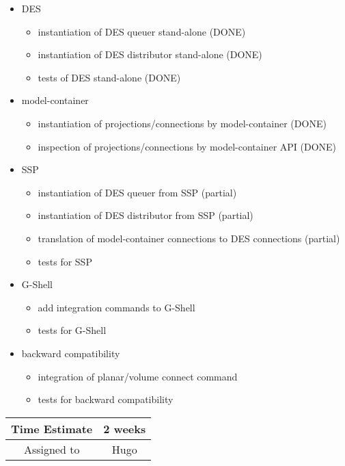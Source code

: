 \documentclass[12pt]{article}
\begin{document}
\begin{itemize}
\item DES
  \begin{itemize}
  \item instantiation of DES queuer stand-alone (DONE)
  \item instantiation of DES distributor stand-alone (DONE)
  \item tests of DES stand-alone (DONE)
  \end{itemize}
\item model-container
  \begin{itemize}
  \item instantiation of projections/connections by model-container (DONE)
  \item inspection of projections/connections by model-container API (DONE)
  \end{itemize}
\item SSP
  \begin{itemize}
  \item instantiation of DES queuer from SSP (partial)
  \item instantiation of DES distributor from SSP (partial)
  \item translation of model-container connections to DES connections (partial)
  \item tests for SSP
  \end{itemize}
\item G-Shell
  \begin{itemize}
  \item add integration commands to G-Shell
  \item tests for G-Shell
  \end{itemize}
\item backward compatibility
  \begin{itemize}
  \item integration of planar/volume connect command
  \item tests for backward compatibility
  \end{itemize}
\end{itemize}


\begin{center}
  \vspace{5mm}
  \centering
  \begin{tabular}{|c|c|}
    \hline
    Time Estimate
    & 2 weeks \\
    \hline
    Assigned to
    & Hugo \\
    \hline
  \end{tabular}
\end{center}
\end{document}
